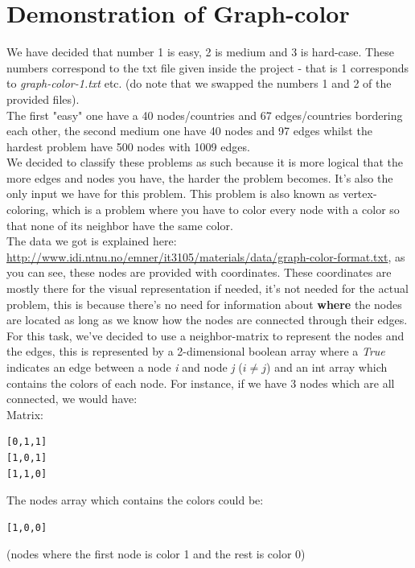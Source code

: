 \documentclass[12pt, a4paper]{article}
\begin{document}
\section{Demonstration of Graph-color}
We have decided that number 1 is easy, 2 is medium and 3 is hard-case.  These numbers correspond to the txt file given inside the project - that is 1 corresponds to \textit{graph-color-1.txt} etc. (do note that we swapped the numbers 1 and 2 of the provided files).\\
The first "easy" one have a 40 nodes/countries and 67 edges/countries bordering each other, the second medium one have 40 nodes and 97 edges whilst the hardest problem have 500 nodes with 1009 edges.\\ 
We decided to classify these problems as such because it is more logical that the more edges and nodes you have, the harder the problem becomes. It's also the only input we have for this problem.
This problem is also known as vertex-coloring, which is a problem where you have to color every node with a color so that none of its neighbor have the same color.\\
The data we got is explained here:\\ \href{http://www.idi.ntnu.no/emner/it3105/materials/data/graph-color-format.txt}{http://www.idi.ntnu.no/emner/it3105/materials/data/graph-color-format.txt},
as you can see, these nodes are provided with coordinates. These coordinates are mostly there for the visual representation if needed, it's not needed for the actual problem, this is because there's no need for information about \textbf{where} the nodes are located as long as we know how the nodes are connected through their edges. For this task, we've decided to use a neighbor-matrix to represent the nodes and the edges, this is represented by a 2-dimensional boolean array where a \textit{True} indicates an edge between a node \textit{i} and node \textit{j} ($i \neq j$) and an int array which contains the colors of each node. For instance, if we have 3 nodes which are all connected, we would have:\\
Matrix:\\
\begin{center}
\begin{verbatim}
[0,1,1]
[1,0,1]
[1,1,0]
\end{verbatim}
\end{center}
The nodes array which contains the colors could be:
\begin{center}
\begin{verbatim}
[1,0,0]
\end{verbatim}
\end{center} (nodes where the first node is color 1 and the rest is color 0)\\
\end{document}
